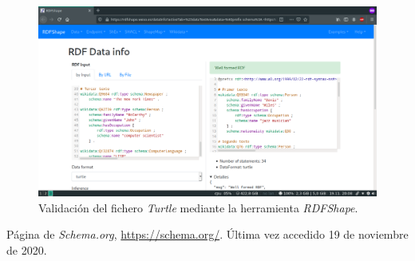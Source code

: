 \documentclass[11pt]{article}
\begin{document}
\begin{figure}[h]
\caption{Validación del fichero \textit{Turtle} mediante la herramienta \textit{RDFShape}.}
\centering
\includegraphics[width=\textwidth]{weso_turtle}
\end{figure}
\begin{thebibliography}{8}
Página de \textit{Schema.org}, \url{https://schema.org/}. Última vez accedido 19 de noviembre de 2020.        
\end{thebibliography}
\end{document}
